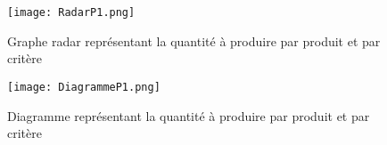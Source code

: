 \begin{figure}[h!]
	\texttt{[image: RadarP1.png]}
	\caption{Graphe radar représentant la quantité à produire par produit et par critère}
\end{figure}

\begin{figure}[h!]
	\texttt{[image: DiagrammeP1.png]}
	\caption{Diagramme représentant la quantité à produire par produit et par critère}
\end{figure}
\newpage
